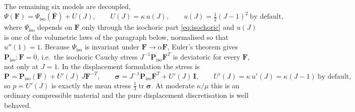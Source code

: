 \documentclass[11pt]{article}
\newcommand{\tr}{\operatorname{tr}}
\newcommand{\bsig}{\bm{\sigma}}
\newcommand{\bP}{\bm{P}}
\newcommand{\bF}{\bm{F}}
\newcommand{\bFb}{\bar{\bm{F}}}
\newcommand{\bI}{\bm{I}}
\begin{document}
The remaining six models are decoupled,
\begin{equation}
  \Psi(\bF) = \Psi_{\mathrm{iso}}(\bFb) + U(J),
  \qquad
  U(J) = \kappa\,u(J),
  \qquad
  u(J) = \tfrac12(J - 1)^2 \ \text{by default},
  \label{eq:split}
\end{equation}
where $\Psi_{\mathrm{iso}}$ depends on $\bF$ only through the isochoric
part \eqref{eq:isochoric} and $u(J)$ is one of the volumetric laws of the
paragraph below, normalised so that $u''(1) = 1$.  Because $\Psi_{\mathrm{iso}}$ is invariant
under $\bF \to \alpha\bF$, Euler's theorem gives
$\bP_{\mathrm{iso}}:\bF = 0$, i.e.\ the isochoric Cauchy stress
$J^{-1}\bP_{\mathrm{iso}}\bF^T$ is deviatoric for every $\bF$, not only at
$J = 1$.  In the displacement formulation the stress is
\begin{equation}
  \bP = \bP_{\mathrm{iso}}(\bF) + U'(J)\,J\bF^{-T},
  \qquad
  \bsig = J^{-1}\bP_{\mathrm{iso}}\bF^T + U'(J)\,\bI ,
  \qquad
  U'(J) = \kappa\,u'(J) = \kappa(J-1) \ \text{by default},
  \label{eq:Pdisp}
\end{equation}
so $p = U'(J)$ is exactly the mean stress $\tfrac13\tr\bsig$.  At
moderate $\kappa/\mu$ this is an ordinary compressible material and the
pure displacement discretisation is well behaved.
\end{document}
